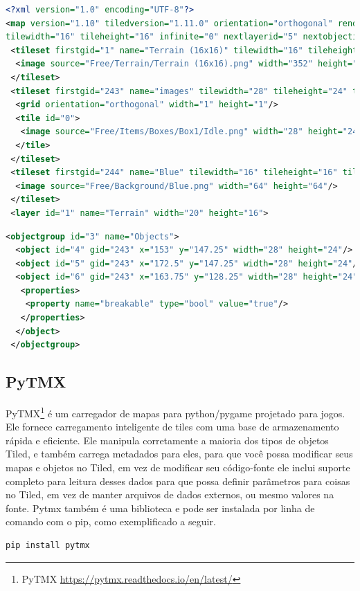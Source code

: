 \newpage
\begin{lstlisting}[language=xml,breaklines, caption= example.tmx terrain layer]
<?xml version="1.0" encoding="UTF-8"?>
<map version="1.10" tiledversion="1.11.0" orientation="orthogonal" renderorder="right-down" width="20" height="16" 
tilewidth="16" tileheight="16" infinite="0" nextlayerid="5" nextobjectid="7">
 <tileset firstgid="1" name="Terrain (16x16)" tilewidth="16" tileheight="16" tilecount="242" columns="22">
  <image source="Free/Terrain/Terrain (16x16).png" width="352" height="176"/>
 </tileset>
 <tileset firstgid="243" name="images" tilewidth="28" tileheight="24" tilecount="1" columns="0">
  <grid orientation="orthogonal" width="1" height="1"/>
  <tile id="0">
   <image source="Free/Items/Boxes/Box1/Idle.png" width="28" height="24"/>
  </tile>
 </tileset>
 <tileset firstgid="244" name="Blue" tilewidth="16" tileheight="16" tilecount="16" columns="4">
  <image source="Free/Background/Blue.png" width="64" height="64"/>
 </tileset>
 <layer id="1" name="Terrain" width="20" height="16">
\end{lstlisting}

\begin{lstlisting}[language=xml,breaklines, caption= example.tmx object layer]
 <objectgroup id="3" name="Objects">
  <object id="4" gid="243" x="153" y="147.25" width="28" height="24"/>
  <object id="5" gid="243" x="172.5" y="147.25" width="28" height="24"/>
  <object id="6" gid="243" x="163.75" y="128.25" width="28" height="24">
   <properties>
    <property name="breakable" type="bool" value="true"/>
   </properties>
  </object>
 </objectgroup>
\end{lstlisting}


\subsection{PyTMX}
\label{sec:pytmx}
PyTMX\footnote{PyTMX \url{https://pytmx.readthedocs.io/en/latest/}} é um carregador de mapas para python/pygame projetado para jogos. Ele fornece carregamento inteligente de tiles com uma base de armazenamento rápida e eficiente. Ele manipula corretamente a maioria dos tipos de objetos Tiled, e também carrega metadados para eles, para que você possa modificar seus mapas e objetos no Tiled, em vez de modificar seu código-fonte ele inclui suporte completo para leitura desses dados para que possa definir parâmetros para coisas no Tiled, em vez de manter arquivos de dados externos, ou mesmo valores na fonte. Pytmx também é uma biblioteca e pode ser instalada por linha de comando com o pip, como exemplificado a seguir.
\begin{lstlisting}[language=bash,breaklines, caption= Instalação Pytmx]
pip install pytmx
\end{lstlisting}

